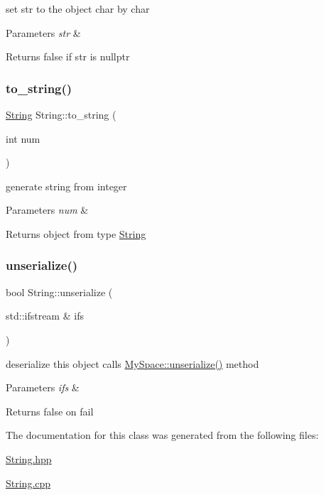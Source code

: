 set str to the object char by char 
\begin{DoxyParams}{Parameters}
{\em str} & \\
\hline
\end{DoxyParams}
\begin{DoxyReturn}{Returns}
false if str is nullptr 
\end{DoxyReturn}
\mbox{\label{classString_a52f9352ece5a5266018539183b0de85c}} 
\subsubsection{\texorpdfstring{to\+\_\+string()}{to\_string()}}
{\footnotesize\ttfamily \hyperlink{classString}{String} String\+::to\+\_\+string (\begin{DoxyParamCaption}\item[{int}]{num }\end{DoxyParamCaption})\hspace{0.3cm}{\ttfamily [static]}}

generate string from integer 
\begin{DoxyParams}{Parameters}
{\em num} & \\
\hline
\end{DoxyParams}
\begin{DoxyReturn}{Returns}
object from type \hyperlink{classString}{String} 
\end{DoxyReturn}
\mbox{\label{classString_a66de7cb14dd606a96dbe3fa8b6aff065}} 
\subsubsection{\texorpdfstring{unserialize()}{unserialize()}}
{\footnotesize\ttfamily bool String\+::unserialize (\begin{DoxyParamCaption}\item[{std\+::ifstream \&}]{ifs }\end{DoxyParamCaption})}

deserialize this object calls \hyperlink{namespaceMySpace_a99c49bdb6efc496c35e1e3ca0167da2b}{My\+Space\+::unserialize()} method 
\begin{DoxyParams}{Parameters}
{\em ifs} & \\
\hline
\end{DoxyParams}
\begin{DoxyReturn}{Returns}
false on fail 
\end{DoxyReturn}


The documentation for this class was generated from the following files\+:\begin{DoxyCompactItemize}
\item 
\hyperlink{String_8hpp}{String.\+hpp}\item 
\hyperlink{String_8cpp}{String.\+cpp}\end{DoxyCompactItemize}
